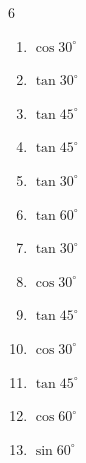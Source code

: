 \begin{multicols}{6}
\begin{enumerate}
  \item $\displaystyle \cos{30^\circ}$


  \item $\displaystyle \tan{30^\circ}$


  \item $\displaystyle \tan{45^\circ}$

        \phantom{$\displaystyle =1$}

  \item $\displaystyle \tan{45^\circ}$

        \phantom{$\displaystyle =1$}

  \item $\displaystyle \tan{30^\circ}$


  \item $\displaystyle \tan{60^\circ}$


  \item $\displaystyle \tan{30^\circ}$


  \item $\displaystyle \cos{30^\circ}$


  \item $\displaystyle \tan{45^\circ}$

        \phantom{$\displaystyle =1$}

  \item $\displaystyle \cos{30^\circ}$


  \item $\displaystyle \tan{45^\circ}$

        \phantom{$\displaystyle =1$}

  \item $\displaystyle \cos{60^\circ}$


  \item $\displaystyle \sin{60^\circ}$


\end{enumerate}
\end{multicols}
